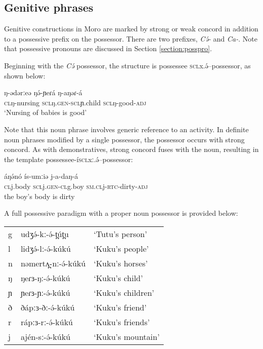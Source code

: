 
\subsection{Genitive phrases}\label{sec:ch8:genitive}

Genitive constructions in Moro are marked by strong or weak concord in addition to a possessive prefix on the possessor. There are two prefixes, \textit{Cə́-} and \textit{Ca-}. Note that possessive pronouns are discussed in Section \ref{section:posspro}.

Beginning with the \textit{Cə́ } possessor, the structure is possessee \textsc{scl}x.ə́--possessor, as shown below:

\ea \gll	ŋ-ədərːeə 	ŋə́-ɲeɾá 		ŋ-aŋəɾ-á \\
	\textsc{cl}ŋ-nursing 	\textsc{scl}ŋ.\textsc{gen}-\textsc{scl}ɲ.child 	\textsc{scl}ŋ-good-\textsc{adj} \\
	\glt	`Nursing of babies is good’
\z 

Note that this noun phrase involves generic reference to an activity. In definite noun phrases modified by a single possessor, the possessor occurs with strong concord. As with demonstratives, strong concord fuses with the noun, resulting in the template possessee-í\textsc{scl}xː.ə́--possessor:

\ea \gll áŋə́nó 	     ís-umːiə 		j-a-daŋ-á \\ 
			\textsc{cl}j.body   \textsc{scl}j.\textsc{gen}-\textsc{cl}g.boy	\textsc{sm}.\textsc{cl}j-\textsc{rtc}-dirty-\textsc{adj}\\
			\glt the boy’s body is dirty
 \z 

A full possessive paradigm with a proper noun possessor is provided below:

\ea \begin{tabular}[t]{lll}
g&	udʒə́-kː-ə́-t̪út̪u &‘Tutu’s person’ \\
l&  	lidʒə́-lː-ə́-kúkú &	‘Kuku’s people’ \\
n &	nəmertʌ̪-nː-ə́-kúkú &	‘Kuku’s horses’ \\
ŋ &	ŋeɾɜ-ŋː-ə́-kúkú &	‘Kuku’s child’\\
ɲ &	ɲeɾɜ-ɲː-ə́-kúkú 	&‘Kuku’s children’\\
ð&	ðápːɜ-ðː-ə́-kúkú &	‘Kuku’s friend’\\
r& 	rápːɜ-rː-ə́-kúkú &	‘Kuku’s friends’\\
j&  	ajén-sː-ə́-kúkú 	&‘Kuku’s mountain’ \\
\end{tabular} \z

